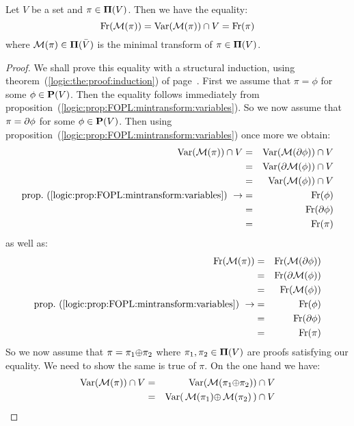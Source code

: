 \begin{prop}\label{logic:prop:FUAP:mintransformproof:freevar}
Let $V$ be a set and $\pi\in\mbox{${\bf\Pi}(V)$}$. Then we have the equality:
    \[
    \mbox{\rm Fr}({\cal M}(\pi))=\mbox{\rm Var}({\cal M}(\pi))\cap V=\mbox{\rm Fr}(\pi)
    \]
where ${\cal M}(\pi)\in{\bf\Pi}(\bar{V})$ is the minimal transform
of $\pi\in\mbox{${\bf\Pi}(V)$}$.
\end{prop}
\begin{proof}
We shall prove this equality with a structural induction, using
theorem~(\ref{logic:the:proof:induction}) of
page~\pageref{logic:the:proof:induction}. First we assume that
$\pi=\phi$ for some $\phi\in\mbox{${\bf P}(V)$}$. Then the equality follows
immediately from
proposition~(\ref{logic:prop:FOPL:mintransform:variables}). So we
now assume that $\pi=\mbox{$\partial$}\phi$ for some $\phi\in\mbox{${\bf P}(V)$}$. Then using
proposition~(\ref{logic:prop:FOPL:mintransform:variables}) once more
we obtain:
    \begin{eqnarray*}
    \var({\cal M}(\pi))\cap V&=&\var({\cal M}(\axi\phi))\cap V\\
    &=&\var(\axi{\cal M}(\phi))\cap V\\
    &=&\var({\cal M}(\phi))\cap V\\
    \mbox{prop.~(\ref{logic:prop:FOPL:mintransform:variables})}\ \rightarrow
    &=&\free(\phi)\\
    &=&\free(\axi\phi)\\
    &=&\free(\pi)\\
    \end{eqnarray*}
as well as:
    \begin{eqnarray*}
    \free({\cal M}(\pi))&=&\free({\cal M}(\axi\phi))\\
    &=&\free(\axi{\cal M}(\phi))\\
    &=&\free({\cal M}(\phi))\\
    \mbox{prop.~(\ref{logic:prop:FOPL:mintransform:variables})}\ \rightarrow
    &=&\free(\phi)\\
    &=&\free(\axi\phi)\\
    &=&\free(\pi)\\
    \end{eqnarray*}
So we now assume that $\pi=\pi_{1}\mbox{$\oplus$}\pi_{2}$ where
$\pi_{1},\pi_{2}\in\mbox{${\bf\Pi}(V)$}$ are proofs satisfying our equality. We need
to show the same is true of $\pi$. On the one hand we have:
    \begin{eqnarray*}
    \var({\cal M}(\pi))\cap V&=&\var({\cal M}(\pi_{1}\pon\pi_{2}))\cap V\\
    &=&\var(\,{\cal M}(\pi_{1})\pon\,{\cal M}(\pi_{2})\,)\cap V\\

\end{eqnarray*}
\end{proof}
